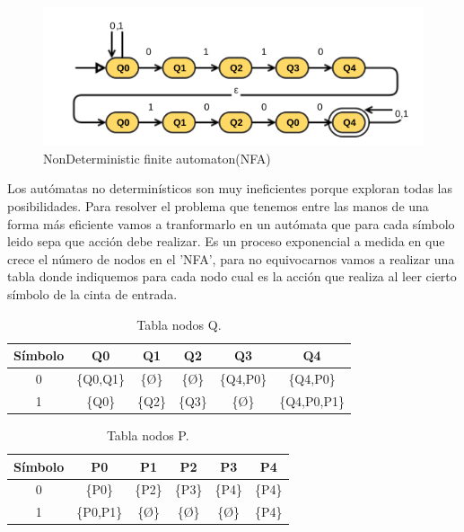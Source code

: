 \begin{figure}[H]
	\includegraphics[scale=0.8]{prac3A.png}
	\caption{NonDeterministic finite automaton(NFA)}
\end{figure}

Los autómatas no determinísticos son muy ineficientes porque exploran todas las posibilidades. Para resolver el problema que tenemos entre las manos de una forma más eficiente vamos a tranformarlo en un autómata que para cada símbolo leido sepa que acción debe realizar. Es un proceso exponencial a medida en que crece el número de nodos en el 'NFA', para no equivocarnos vamos a realizar una tabla donde indiquemos para cada nodo cual es la acción que realiza al leer cierto símbolo de la cinta de entrada.

\begin{table}[H]
	\begin{center}
			\begin{tabular}{|c|c|c|c|c|c|}
			\hline
			\textbf{Símbolo} & \textbf{Q0} & \textbf{Q1} & \textbf{Q2} & \textbf{Q3} & \textbf{Q4} \\
			\hline \hline
			0 & \{Q0,Q1\} & \{Ø\} & \{Ø\} & \{Q4,P0\} & \{Q4,P0\}\\ \hline
			1 & \{Q0\} & \{Q2\} & \{Q3\} & \{Ø\} & \{Q4,P0,P1\} \\ \hline
		\end{tabular}
	\end{center}
		\caption{Tabla nodos Q.}
		\label{tabla:nodosQ}
\end{table}  

\begin{table}[H]
	\begin{center}
		\begin{tabular}{|c|c|c|c|c|c|}
			\hline
			\textbf{Símbolo} & \textbf{P0} & \textbf{P1} & \textbf{P2} & \textbf{P3} & \textbf{P4} \\
			\hline \hline
			0 & \{P0\} & \{P2\} & \{P3\} & \{P4\} & \{P4\}\\ \hline
			1 & \{P0,P1\} & \{Ø\} & \{Ø\} & \{Ø\} & \{P4\} \\ \hline
		\end{tabular}
	\end{center}
	\caption{Tabla nodos P.}
	\label{tabla:nodosP}
\end{table} 

